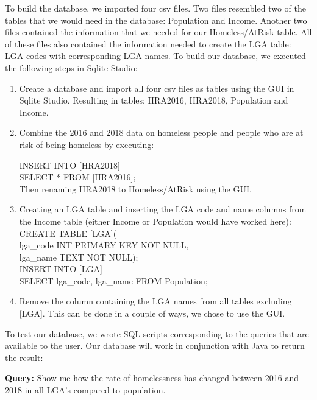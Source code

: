\documentclass[12pt, a4paper]{article}
\begin{document}
To build the database, we imported four csv files. Two files resembled two of the tables that we would need in the database: Population and Income. Another two files contained the information that we needed for our Homeless/AtRisk table. All of these files also contained the information needed to create the LGA table: LGA codes with corresponding LGA names. To build our database, we executed the following steps in Sqlite Studio:

\begin{enumerate}
\item Create a database and import all four csv files as tables using the GUI in Sqlite Studio. Resulting in tables: HRA2016, HRA2018, Population and Income.
\item Combine the 2016 and 2018 data on homeless people and people who are at risk of being homeless by executing: 

\hspace*{10mm}%
INSERT INTO [HRA2018]\\
\hspace*{10mm}%
SELECT * FROM [HRA2016];\\
Then renaming HRA2018 to Homeless/AtRisk using the GUI.
\item Creating an LGA table and inserting the LGA code and name columns from the Income table (either Income or Population would have worked here):\\
\hspace*{10mm}%
CREATE TABLE [LGA](\\
\hspace*{10mm}%
lga\_code INT PRIMARY KEY NOT NULL,\\
\hspace*{10mm}%
lga\_name TEXT NOT NULL);\\
\hspace*{10mm}%
INSERT INTO [LGA]\\
\hspace*{10mm}%
SELECT lga\_code, lga\_name FROM Population;
\item Remove the column containing the LGA names from all tables excluding [LGA]. This can be done in a couple of ways, we chose to use the GUI.
\end{enumerate}
To test our database, we wrote SQL scripts corresponding to the queries that are available to the user. Our database will work in conjunction with Java to return the result: 

\textbf{Query:} Show me how the rate of homelessness has changed between 2016 and 2018 in all LGA's compared to population.
\end{document}

